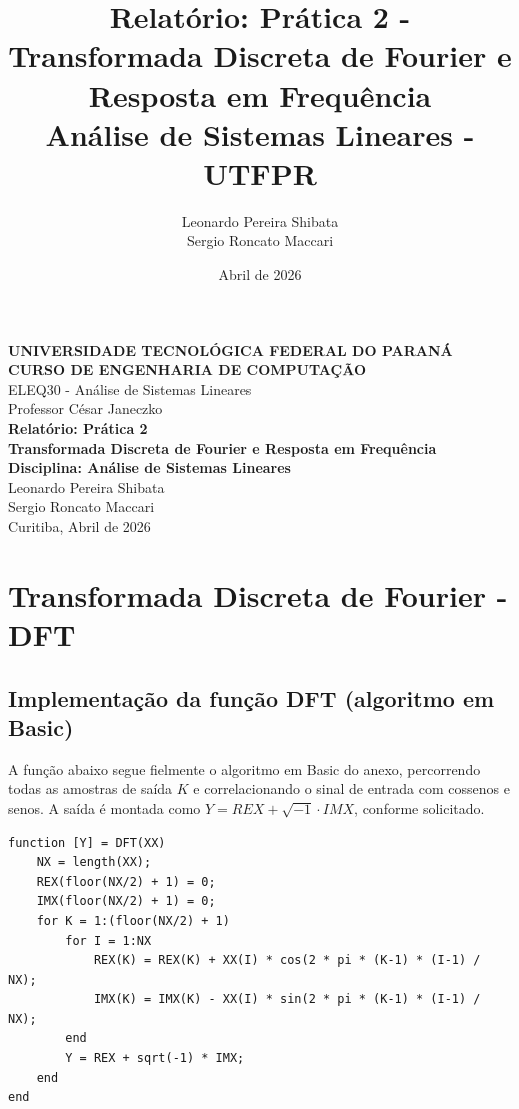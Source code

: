 \documentclass[12pt]{article}
\title{Relatório: Prática 2 - Transformada Discreta de Fourier e Resposta em Frequência \\ \large Análise de Sistemas Lineares - UTFPR}
\author{Leonardo Pereira Shibata \\ Sergio Roncato Maccari}
\date{Abril de 2026}
\begin{document}
\begin{titlepage}
    \begin{center}
        \Large \textbf{UNIVERSIDADE TECNOLÓGICA FEDERAL DO PARANÁ} \\
        \Large \textbf{CURSO DE ENGENHARIA DE COMPUTAÇÃO} \\
        \large ELEQ30 - Análise de Sistemas Lineares \\
        \large Professor César Janeczko \\
        \vspace{5cm}
        \huge \textbf{Relatório: Prática 2} \\
        \large \textbf{Transformada Discreta de Fourier e Resposta em Frequência} \\
        \vspace{1.5cm}
        \Large \textbf{Disciplina: Análise de Sistemas Lineares} \\
        \vspace{4cm}
        \Large Leonardo Pereira Shibata \\
        \Large Sergio Roncato Maccari \\
        \vfill
        \Large Curitiba, Abril de 2026
    \end{center}
\end{titlepage}

\section{Transformada Discreta de Fourier - DFT}

\subsection{Implementação da função DFT (algoritmo em Basic)}

A função abaixo segue fielmente o algoritmo em Basic do anexo, percorrendo todas as amostras de saída $K$ e correlacionando o sinal de entrada com cossenos e senos.
A saída é montada como $Y = REX + \sqrt{-1}\cdot IMX$, conforme solicitado.

\begin{lstlisting}
function [Y] = DFT(XX)
    NX = length(XX);
    REX(floor(NX/2) + 1) = 0;
    IMX(floor(NX/2) + 1) = 0;
    for K = 1:(floor(NX/2) + 1)
        for I = 1:NX
            REX(K) = REX(K) + XX(I) * cos(2 * pi * (K-1) * (I-1) / NX);
            IMX(K) = IMX(K) - XX(I) * sin(2 * pi * (K-1) * (I-1) / NX);
        end
        Y = REX + sqrt(-1) * IMX;
    end
end
\end{lstlisting}
\end{document}

